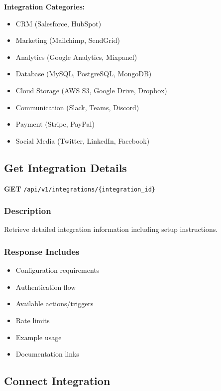 \documentclass[11pt,a4paper]{report}
\begin{document}
\begin{infobox}
\textbf{Integration Categories:}
\begin{itemize}[leftmargin=*]
    \item CRM (Salesforce, HubSpot)
    \item Marketing (Mailchimp, SendGrid)
    \item Analytics (Google Analytics, Mixpanel)
    \item Database (MySQL, PostgreSQL, MongoDB)
    \item Cloud Storage (AWS S3, Google Drive, Dropbox)
    \item Communication (Slack, Teams, Discord)
    \item Payment (Stripe, PayPal)
    \item Social Media (Twitter, LinkedIn, Facebook)
\end{itemize}
\end{infobox}

\subsection{Get Integration Details}

\textbf{GET} \texttt{/api/v1/integrations/\{integration\_id\}}

\subsubsection{Description}
Retrieve detailed integration information including setup instructions.

\subsubsection{Response Includes}
\begin{itemize}[leftmargin=*]
    \item Configuration requirements
    \item Authentication flow
    \item Available actions/triggers
    \item Rate limits
    \item Example usage
    \item Documentation links
\end{itemize}

\subsection{Connect Integration}
\end{document}
